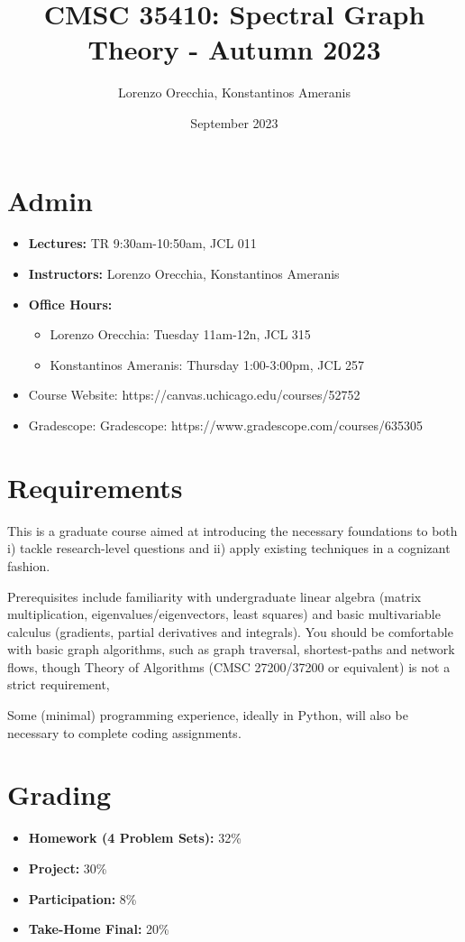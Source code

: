\documentclass{article}
\title{CMSC 35410: Spectral Graph Theory - Autumn 2023}
\author{Lorenzo Orecchia, Konstantinos Ameranis}
\date{September 2023}
\begin{document}
\maketitle

\section{Admin}

\begin{itemize}
    \item \textbf{Lectures:} TR 9:30am-10:50am, JCL 011
    \item \textbf{Instructors:} Lorenzo Orecchia, Konstantinos Ameranis
    \item \textbf{Office Hours:}
    \begin{itemize}
        \item Lorenzo Orecchia: Tuesday 11am-12n, JCL 315
        \item Konstantinos Ameranis: Thursday 1:00-3:00pm, JCL 257
    \end{itemize}
    \item Course Website: https://canvas.uchicago.edu/courses/52752
    \item Gradescope: Gradescope: https://www.gradescope.com/courses/635305
    
\end{itemize}

\section{Requirements}

This is a graduate course aimed at introducing the necessary foundations to both i) tackle research-level questions and ii) apply existing techniques in a cognizant fashion.

Prerequisites include familiarity with undergraduate linear algebra (matrix multiplication, eigenvalues/eigenvectors, least squares) and basic multivariable calculus (gradients, partial derivatives and integrals). You should be comfortable with basic graph algorithms, such as graph traversal, shortest-paths and network flows, though Theory of Algorithms (CMSC 27200/37200 or equivalent) is not a strict requirement,

Some (minimal) programming experience, ideally in Python, will also be necessary to complete coding assignments.

\section{Grading}
\begin{itemize}
    \item \textbf{Homework (4 Problem Sets):} 32\%
    \item \textbf{Project:} 30\%
    \item \textbf{Participation:} 8\%
    \item \textbf{Take-Home Final:} 20\%
\end{itemize}
\end{document}
